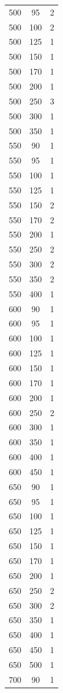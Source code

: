 \begin{longtable}{c c c}
500 & 95 & 2 \\
500 & 100 & 2 \\
500 & 125 & 1 \\
500 & 150 & 1 \\
500 & 170 & 1 \\
500 & 200 & 1 \\
500 & 250 & 3 \\
500 & 300 & 1 \\
500 & 350 & 1 \\
550 & 90 & 1 \\
550 & 95 & 1 \\
550 & 100 & 1 \\
550 & 125 & 1 \\
550 & 150 & 2 \\
550 & 170 & 2 \\
550 & 200 & 1 \\
550 & 250 & 2 \\
550 & 300 & 2 \\
550 & 350 & 2 \\
550 & 400 & 1 \\
600 & 90 & 1 \\
600 & 95 & 1 \\
600 & 100 & 1 \\
600 & 125 & 1 \\
600 & 150 & 1 \\
600 & 170 & 1 \\
600 & 200 & 1 \\
600 & 250 & 2 \\
600 & 300 & 1 \\
600 & 350 & 1 \\
600 & 400 & 1 \\
600 & 450 & 1 \\
650 & 90 & 1 \\
650 & 95 & 1 \\
650 & 100 & 1 \\
650 & 125 & 1 \\
650 & 150 & 1 \\
650 & 170 & 1 \\
650 & 200 & 1 \\
650 & 250 & 2 \\
650 & 300 & 2 \\
650 & 350 & 1 \\
650 & 400 & 1 \\
650 & 450 & 1 \\
650 & 500 & 1 \\
700 & 90 & 1 \\

\end{longtable}
